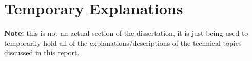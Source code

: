 \chapter{Temporary Explanations}

\textbf{Note:} this is not an actual section of the dissertation, it is just being used to temporarily hold all of the explanations/descriptions of the technical topics discussed in this report.
